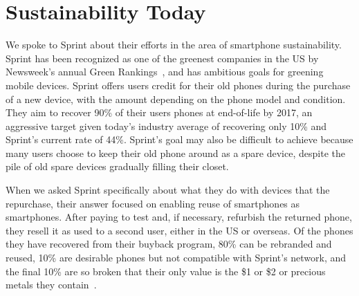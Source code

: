 \section{Sustainability Today}
\label{sec-sustainability}

We spoke to Sprint about their efforts in the area of smartphone
sustainability. Sprint has been recognized as one of the greenest companies
in the US by Newsweek's annual Green Rankings~\cite{sprintgreen-url}, and has
ambitious goals for greening mobile devices. Sprint offers users credit for
their old phones during the purchase of a new device, with the amount
depending on the phone model and condition. They aim to recover 90\% of their
users phones at end-of-life by 2017, an aggressive target given today's
industry average of recovering only 10\% and Sprint's current rate of 44\%.
Sprint's goal may also be difficult to achieve because many users choose to
keep their old phone around as a spare device, despite the pile of old spare
devices gradually filling their closet.

When we asked Sprint specifically about what they do with devices that the
repurchase, their answer focused on enabling reuse of smartphones as
smartphones. After paying to test and, if necessary, refurbish the returned
phone, they resell it as used to a second user, either in the US or overseas.
Of the phones they have recovered from their buyback program, 80\% can be
rebranded and reused, 10\% are desirable phones but not compatible with
Sprint's network, and the final 10\% are so broken that their only value is
the \$1 or \$2 or precious metals they contain~\cite{FIXME-goldinphone}.
